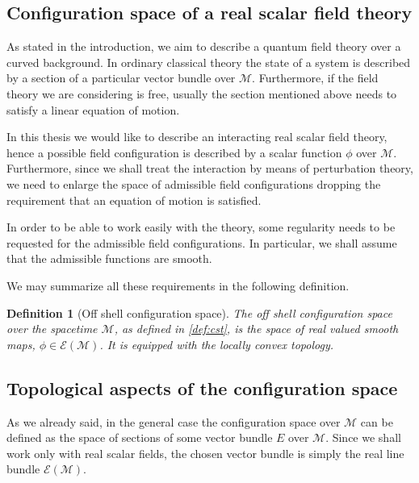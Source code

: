 \documentclass[11pt]{book}
\newcommand{\Ecal}{\mathcal{E}}
\newcommand{\Mcal}{\mathcal{M}}
\theoremstyle{break}
\newtheorem{definition}{Definition}[chapter]
\begin{document}
\subsection{Configuration space of a real scalar field theory}
\label{p:DEF_CONFIG_SPACE}


As stated in the introduction, we aim to describe a quantum field theory over a curved background. In ordinary classical theory the state of a system is described by a section of a particular vector bundle over $\Mcal$. Furthermore, if the field theory we are considering is free, usually the section mentioned above needs to satisfy a linear equation of motion.


In this thesis we would like to describe an interacting real scalar field theory, hence a possible field configuration is described by a scalar function $\phi$ over $\Mcal$. Furthermore, since we shall treat the interaction by means of perturbation theory, we need to enlarge the space of admissible field configurations dropping the requirement that an equation of motion is satisfied.


In order to be able to work easily with the theory, some regularity needs to be requested for the admissible field configurations. In particular, we shall assume that the admissible functions are smooth.   


We may summarize all these requirements in the following definition.


\begin{definition}[Off shell configuration space]\label{def:config_space}
The off shell configuration space over the spacetime $\Mcal$, as defined in \ref{def:cst}, is the space of real valued smooth maps, $\phi \in \Ecal(\Mcal)$. It is equipped with the locally convex topology.
\end{definition}


\subsection{Topological aspects of the configuration space}
\label{p:TOPO_CONFIG_SPACE}


As we already said, in the general case the configuration space over $\Mcal$ can be defined as the space of sections of some vector bundle $E$ over $\Mcal$. Since we shall work only with real scalar fields, the chosen vector bundle is simply the real line bundle $\Ecal(\Mcal)$.
\end{document}
